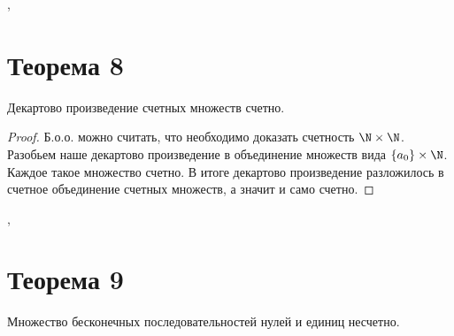 \documentclass[a4paper,12pt]{article}
\begin{document}
\sep
    \section{Теорема 8}
    
    \begin{theorem}
        Декартово произведение счетных множеств счетно.
    \end{theorem}
    \begin{proof}
        Б.о.о. можно считать, что необходимо доказать счетность $\N \times \N$. Разобьем наше декартово произведение в объединение множеств вида $ \{a_0\} \times \N $. Каждое такое множество счетно. В итоге декартово произведение разложилось в счетное объединение счетных множеств, а значит и само счетно.
    \end{proof}

    \sep
    \section{Теорема 9}
    \begin{theorem}
        Множество бесконечных последовательностей нулей и единиц несчетно. 
    \end{theorem}
    
\end{document}
